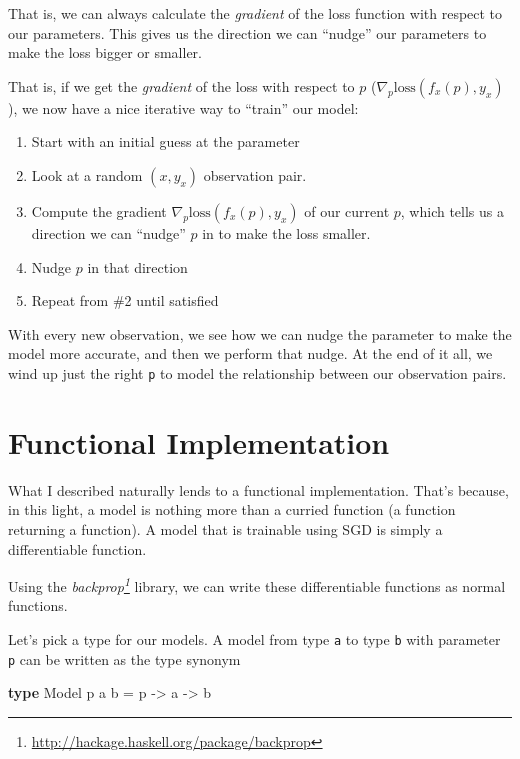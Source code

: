 \documentclass[]{article}
\newenvironment{Shaded}{}{}
\newcommand{\DataTypeTok}[1]{\textcolor[rgb]{0.56,0.13,0.00}{#1}}
\newcommand{\KeywordTok}[1]{\textcolor[rgb]{0.00,0.44,0.13}{\textbf{#1}}}
\newcommand{\NormalTok}[1]{#1}
\newcommand{\OtherTok}[1]{\textcolor[rgb]{0.00,0.44,0.13}{#1}}
\renewcommand{\href}[2]{#2\footnote{\url{#1}}}
\begin{document}
That is, we can always calculate the \emph{gradient} of the loss function with
respect to our parameters. This gives us the direction we can ``nudge'' our
parameters to make the loss bigger or smaller.

That is, if we get the \emph{gradient} of the loss with respect to \(p\)
(\(\nabla_p
\text{loss}(f_x(p), y_x)\)), we now have a nice iterative way to ``train'' our
model:

\begin{enumerate}
\def\labelenumi{\arabic{enumi}.}
\tightlist
\item
  Start with an initial guess at the parameter
\item
  Look at a random \((x, y_x)\) observation pair.
\item
  Compute the gradient \(\nabla_p \text{loss}(f_x(p), y_x)\) of our current
  \(p\), which tells us a direction we can ``nudge'' \(p\) in to make the loss
  smaller.
\item
  Nudge \(p\) in that direction
\item
  Repeat from \#2 until satisfied
\end{enumerate}

With every new observation, we see how we can nudge the parameter to make the
model more accurate, and then we perform that nudge. At the end of it all, we
wind up just the right \texttt{p} to model the relationship between our
observation pairs.

\section{Functional Implementation}\label{functional-implementation}

What I described naturally lends to a functional implementation. That's because,
in this light, a model is nothing more than a curried function (a function
returning a function). A model that is trainable using SGD is simply a
differentiable function.

Using the \emph{\href{http://hackage.haskell.org/package/backprop}{backprop}}
library, we can write these differentiable functions as normal functions.

Let's pick a type for our models. A model from type \texttt{a} to type
\texttt{b} with parameter \texttt{p} can be written as the type synonym

\begin{Shaded}
\begin{Highlighting}[]
\KeywordTok{type} \DataTypeTok{Model}\NormalTok{ p a b }\OtherTok{=}\NormalTok{ p }\OtherTok{{-}\textgreater{}}\NormalTok{ a }\OtherTok{{-}\textgreater{}}\NormalTok{ b}
\end{Highlighting}
\end{Shaded}
\end{document}
